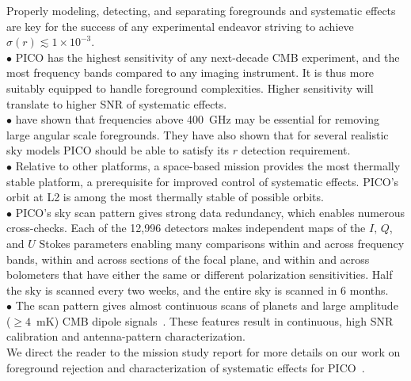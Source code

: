 \documentclass[PICOAPC.tex]{subfiles}
\begin{document}
Properly modeling, detecting, and separating foregrounds and systematic effects are key for the success of any experimental endeavor striving to achieve $\sigma(r) \lesssim 1 \times 10^{-3}$. \\
$\bullet$ \hspace{0.1in}  PICO has the highest sensitivity of any next-decade CMB experiment, and the most frequency bands compared to any imaging instrument. It is thus more suitably equipped to handle foreground complexities. Higher sensitivity will translate to higher \ac{SNR} of systematic effects. \\ 
$\bullet$ \hspace{0.1in}  \citet{pico_report} have shown that frequencies above 400~GHz may be essential for removing large angular scale foregrounds. They have also shown that for several realistic sky models PICO should be able to satisfy its $r$ detection requirement.  \\
$\bullet$ \hspace{0.1in}  Relative to other platforms, a space-based mission provides the most thermally stable platform,  a prerequisite for improved control of systematic effects. PICO's orbit at L2 is among the most thermally stable of possible orbits. \\
$\bullet$ \hspace{0.1in} PICO's sky scan pattern gives strong data redundancy, which enables numerous cross-checks. Each of the 12,996 detectors makes independent maps of the $I,\,Q$, and $U$ Stokes parameters enabling many comparisons within and across frequency bands, within and across sections of the focal plane, and within and across bolometers that have either the same or different polarization sensitivities. Half the sky is scanned every two weeks, and the entire sky is scanned in 6 months. \\
$\bullet$ \hspace{0.1in}  The scan pattern gives almost continuous scans of planets and large amplitude ($\geq 4$~mK) CMB dipole signals~\citep{picoweb_dipole}. These features result in continuous, high \ac{SNR} calibration and antenna-pattern characterization. \\
We direct the reader to the mission study report for more details on our work on foreground rejection and characterization of systematic effects for PICO~\citep{pico_report}.
\end{document}
